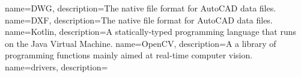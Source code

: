 
{
        name=DWG,
        description={The native file format for AutoCAD data files.}
}
{
        name=DXF,
        description={The native file format for AutoCAD data files.}
}
{
        name=Kotlin,
        description={A statically-typed programming language that runs on the Java Virtual Machine.}
}
{
        name=OpenCV,
        description={A a library of programming functions mainly aimed at real-time computer vision.}
}
{
	name=drivers,
	description={}
}